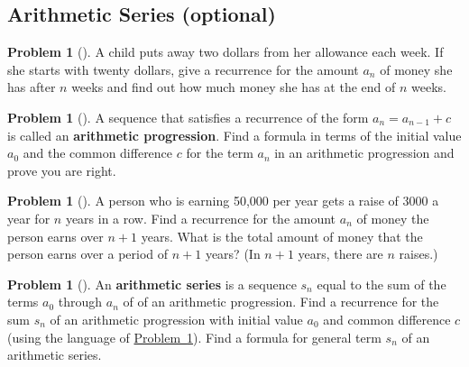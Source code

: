 \documentclass[10pt,]{book}
\newcommand{\terminology}[1]{\textbf{#1}}
\theoremstyle{plain}
\theoremstyle{definition}
\newtheorem{activity}[project]{Problem}
\theoremstyle{definition}
\numberwithin{equation}{chapter}
\begin{document}
\subsection[{Arithmetic Series (optional)}]{Arithmetic Series (optional)}\label{subsection-18}
\begin{activity}[]\marginsymbol[-1em]{} \label{childsaving}
\hypertarget{p-564}{}%
A child puts away two dollars from her allowance each week. If she starts with twenty dollars, give a recurrence for the amount \(a_n\) of money she has after \(n\) weeks and find out how much money she has at the end of \(n\) weeks.%
\end{activity}
\begin{activity}[]\marginsymbol[-1em]{} \label{arithmeticprogression}
\hypertarget{p-566}{}%
A sequence that satisfies a recurrence of the form \(a_n=a_{n-1} +c\) is called an \terminology{arithmetic progression}. Find a formula in terms of the initial value \(a_0\) and the common difference \(c\) for the term \(a_n\) in an arithmetic progression and prove you are right.%
\end{activity}
\begin{activity}[]\marginsymbol[-1em]{} \label{activity-95}
\hypertarget{p-568}{}%
A person who is earning \textdollar{}50,000 per year gets a raise of \textdollar{}3000 a year for \(n\) years in a row. Find a recurrence for the amount \(a_n\) of money the person earns over \(n+1\) years. What is the total amount of money that the person earns over a period of \(n+1\) years? (In \(n+1\) years, there are \(n\) raises.)%
\end{activity}
\begin{activity}[]\marginsymbol[-1em]{} \label{activity-96}
\hypertarget{p-570}{}%
An \terminology{arithmetic series} is a sequence \(s_n\) equal to the sum of the terms \(a_0\) through \(a_n\) of of an arithmetic progression. Find a recurrence for the sum \(s_n\) of an arithmetic progression with initial value \(a_0\) and common difference \(c\) (using the language of \hyperref[arithmeticprogression]{Problem~\ref{arithmeticprogression}}). Find a formula for general term \(s_n\) of an arithmetic series.%
\end{activity}
\typeout{************************************************}
\typeout{************************************************}
\end{document}
